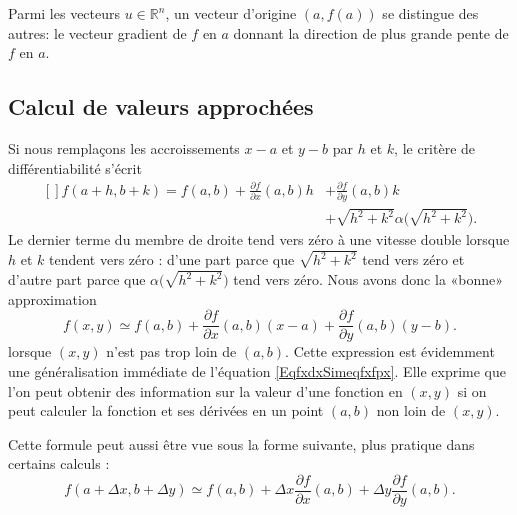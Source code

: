 Parmi les vecteurs $u \in \mathbb{R}^n$, un vecteur d'origine $(a, f(a))$ se distingue des autres: le vecteur gradient de $f$ en $a$ donnant la direction de plus grande pente de $f$ en $a$.

\subsection{Calcul de valeurs approchées}

Si nous remplaçons les accroissements $x-a$ et $y-b$ par $h$ et $k$, le critère de différentiabilité s'écrit
\begin{equation}
    \begin{aligned}[]
        f(a+h,b+k)=f(a,b)+\frac{ \partial f }{ \partial x }(a,b)h&+\frac{ \partial f }{ \partial y }(a,b)k\\
        &+\sqrt{h^2+k^2}\alpha\big( \sqrt{h^2+k^2} \big).
    \end{aligned}
\end{equation}
Le dernier terme du membre de droite tend vers zéro à une vitesse double lorsque $h$ et $k$ tendent vers zéro : d'une part parce que $\sqrt{h^2+k^2}$ tend vers zéro et d'autre part parce que $\alpha\big( \sqrt{h^2+k^2} \big)$ tend vers zéro. Nous avons donc la «bonne» approximation
\begin{equation}        \label{EqFormApproxfxyab}
    f(x,y)\simeq f(a,b)+\frac{ \partial f }{ \partial x }(a,b)(x-a)+\frac{ \partial f }{ \partial y }(a,b)(y-b).
\end{equation}
lorsque $(x,y)$ n'est pas trop loin de $(a,b)$. Cette expression est évidemment une généralisation immédiate de l'équation \eqref{EqfxdxSimeqfxfpx}. Elle exprime que l'on peut obtenir des information sur la valeur d'une fonction en $(x,y)$ si on peut calculer la fonction et ses dérivées en un point $(a,b)$ non loin de $(x,y)$.

Cette formule peut aussi être vue sous la forme suivante, plus pratique dans certains calculs :
\begin{equation}        \label{EqFormApproxfxyabDF}
    f(a+\Delta x,b+\Delta y)\simeq f(a,b)+\Delta x\frac{ \partial f }{ \partial x }(a,b)+\Delta y\frac{ \partial f }{ \partial y }(a,b).
\end{equation}

